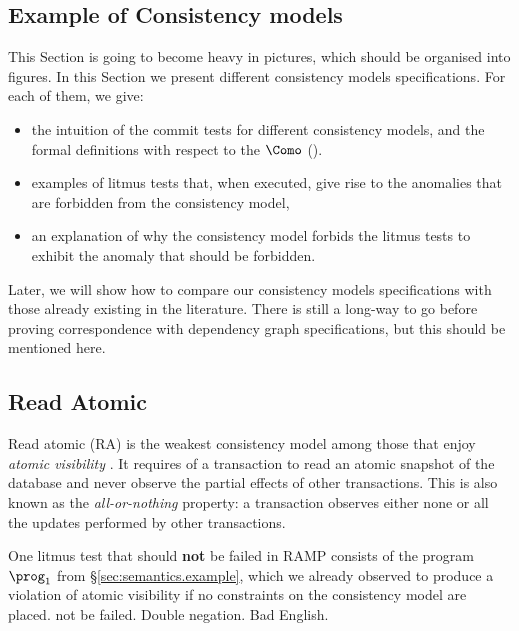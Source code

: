 \subsection{Example of Consistency models}
\ac{This Section is going to become heavy in pictures, which should be organised into figures.}
In this Section we present different consistency models specifications. 
For each of them, we give: 
\begin{itemize}
\item the intuition of the commit tests for different consistency models, and the formal definitions with respect to the \(\Como\) ().
\item examples of litmus tests that, when executed, give rise to the anomalies that are forbidden from the consistency model, 
\item an explanation of why the consistency model forbids the litmus tests to exhibit the anomaly that should be forbidden. 
\end{itemize}
Later, we will show how to compare our consistency models specifications with those already existing in the 
literature.
\ac{There is still a long-way to go before proving correspondence with dependency graph specifications, 
but this should be mentioned here.}


\subsection{Read Atomic} 
Read atomic (RA) \cite{ramp} is the weakest consistency model among those that enjoy \emph{atomic visibility} \cite{framework-concur}. 
It requires of a transaction to read an atomic snapshot of the database and never observe the partial effects of other transactions.
This is also known as the \emph{all-or-nothing} property: a transaction observes either none or all the updates performed by other transactions. 

One litmus test that should \textbf{not} be failed in RAMP consists of the program $\prog_1$ from \S \ref{sec:semantics.example}, which we already observed to produce a violation of atomic visibility if no constraints on the consistency model are placed.
\ac{not be failed. Double negation. Bad English.}

